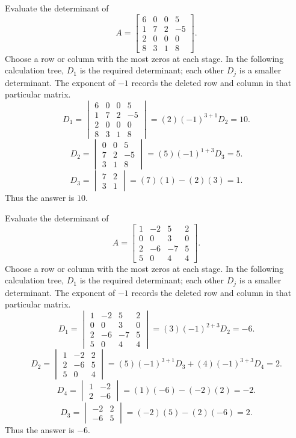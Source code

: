 \goal Evaluate the determinant of
\[A=\begin{bmatrix}6&0&0&5\\1&7&2&-5\\2&0&0&0\\8&3&1&8\end{bmatrix}.\]
Choose a row or column with the most zeros at each stage. In the following calculation tree, $D_{1}$ is the required determinant; each other $D_j$ is a smaller determinant. The exponent of $-1$ records the deleted row and column in that particular matrix.
\[
D_{1}=\begin{vmatrix}6&0&0&5\\1&7&2&-5\\2&0&0&0\\8&3&1&8\end{vmatrix}=(2)(-1)^{3+1}D_{2}=10.
\]
\[
D_{2}=\begin{vmatrix}0&0&5\\7&2&-5\\3&1&8\end{vmatrix}=(5)(-1)^{1+3}D_{3}=5.
\]
\[
D_{3}=\begin{vmatrix}7&2\\3&1\end{vmatrix}=(7)(1)-(2)(3)=1.
\]
Thus the answer is $10$.

\goal Evaluate the determinant of
\[A=\begin{bmatrix}1&-2&5&2\\0&0&3&0\\2&-6&-7&5\\5&0&4&4\end{bmatrix}.\]
Choose a row or column with the most zeros at each stage. In the following calculation tree, $D_{1}$ is the required determinant; each other $D_j$ is a smaller determinant. The exponent of $-1$ records the deleted row and column in that particular matrix.
\[
D_{1}=\begin{vmatrix}1&-2&5&2\\0&0&3&0\\2&-6&-7&5\\5&0&4&4\end{vmatrix}=(3)(-1)^{2+3}D_{2}=-6.
\]
\[
D_{2}=\begin{vmatrix}1&-2&2\\2&-6&5\\5&0&4\end{vmatrix}=(5)(-1)^{3+1}D_{3} + (4)(-1)^{3+3}D_{4}=2.
\]
\[
D_{4}=\begin{vmatrix}1&-2\\2&-6\end{vmatrix}=(1)(-6)-(-2)(2)=-2.
\]
\[
D_{3}=\begin{vmatrix}-2&2\\-6&5\end{vmatrix}=(-2)(5)-(2)(-6)=2.
\]
Thus the answer is $-6$.

